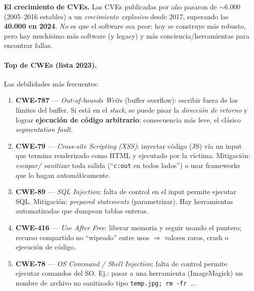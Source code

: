 \documentclass[11pt,a4paper]{article}
\begin{document}
\begin{slidebox}
\textbf{El crecimiento de CVEs.} Las CVEs publicadas por año pasaron de $\sim$6.000 (2005--2016
estables) a un \emph{crecimiento explosivo} desde 2017, superando las \textbf{40.000 en 2024}.
\emph{No} es que el software sea peor: hoy se construye más robusto, pero hay muchísimo más
software (y legacy) y más conciencia/herramientas para encontrar fallas.
\end{slidebox}

\paragraph{Top de CWEs (lista 2023).} Las debilidades más frecuentes:
\begin{enumerate}[leftmargin=1.8em,itemsep=1pt]
  \item \textbf{CWE-787} — \emph{Out-of-bounds Write} (buffer overflow): escribir fuera de los
        límites del buffer. Si está en el \emph{stack}, se puede pisar la \emph{dirección de
        retorno} y lograr \textbf{ejecución de código arbitrario}; consecuencia más leve, el
        clásico \emph{segmentation fault}.
  \item \textbf{CWE-79} — \emph{Cross-site Scripting (XSS)}: inyectar código (JS) vía un input
        que termina renderizado como HTML y ejecutado por la víctima. Mitigación: \emph{escapar/
        sanitizar} toda salida (``\texttt{c:out} en todos lados'') o usar frameworks que lo
        hagan automáticamente.
  \item \textbf{CWE-89} — \emph{SQL Injection}: falta de control en el input permite ejecutar
        SQL. Mitigación: \emph{prepared statements} (parametrizar). Hay herramientas
        automatizadas que dumpean tablas enteras.
  \item \textbf{CWE-416} — \emph{Use After Free}: liberar memoria y seguir usando el puntero;
        recurso compartido no ``wipeado'' entre usos $\Rightarrow$ valores raros, crash o
        ejecución de código.
  \item \textbf{CWE-78} — \emph{OS Command / Shell Injection}: falta de control permite
        ejecutar comandos del SO. Ej.: pasar a una herramienta (ImageMagick) un nombre de
        archivo no sanitizado tipo \texttt{temp.jpg; rm -fr .}.
\end{enumerate}
\end{document}
